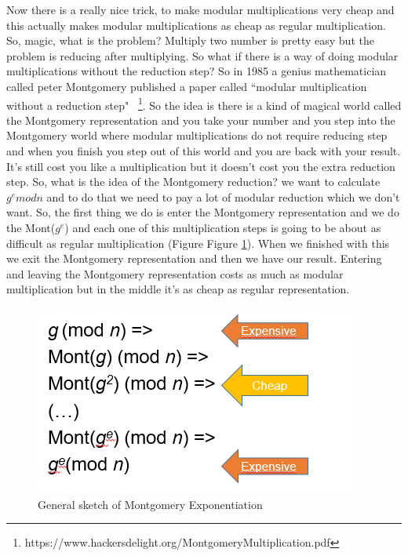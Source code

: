 Now there is a really nice trick, to make modular multiplications very cheap and
this actually makes modular multiplications as cheap as regular multiplication.
So, magic, what is the problem? Multiply two number is pretty easy but the
problem is reducing after multiplying. So what if there is a way of doing
modular multiplications without the reduction step? So in 1985 a genius
mathematician called peter Montgomery published a paper called ``modular
multiplication without a reduction step"
~\cite{warren2013hacker}\footnote{https://www.hackersdelight.org/MontgomeryMultiplication.pdf}.
So the idea is there is a kind of magical world called the Montgomery
representation and you take your number and you step into the Montgomery world
where modular multiplications do not require reducing step and when you finish
you step out of this world and you are back with your result. It's still cost
you like a multiplication but it doesn't cost you the extra reduction step. So,
what is the idea of the Montgomery reduction? we want to calculate \(g^emodn\)
and to do that we need to pay a lot of modular reduction which we  don't want.
So, the first thing we do is enter the Montgomery representation and we do the
Mont(\(g^e\)) and each one of this multiplication steps is going to be about as
difficult as regular multiplication (Figure Figure \ref{montg:fig}). When we
finished with this we exit the Montgomery representation and then we have our
result. Entering and leaving the Montgomery representation costs as much as
modular multiplication but in the middle it's as cheap as regular
representation.

\begin{figure}[!ht]
    \centering
    \includegraphics[scale=0.7]{images/montg.PNG}
    \caption{General sketch of Montgomery Exponentiation} \label{montg:fig}
\end{figure}


